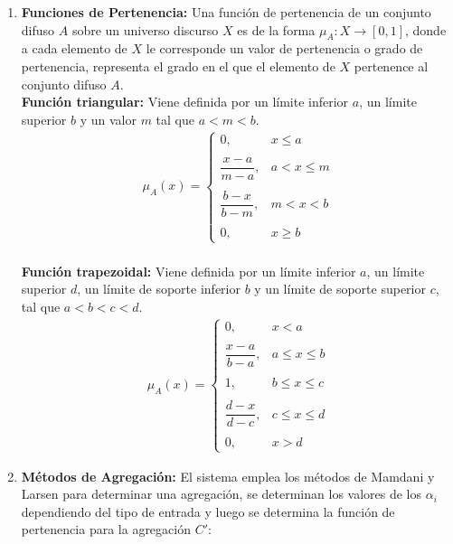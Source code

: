 \documentclass[10pt,letterpaper]{article}
\begin{document}
\begin{enumerate} 
\item \textbf{Funciones de Pertenencia:}
Una función de pertenencia de un conjunto difuso $A$ sobre un universo discurso $X$ es de la forma $\mu_{A}:X \rightarrow [0,1]$, donde a cada elemento de $X$ le corresponde un valor de pertenencia o grado de pertenencia, representa el grado en el que el elemento de $X$ pertenence al conjunto difuso $A$.\\
	
	\textbf{Función triangular:} Viene definida por un límite inferior $a$, un límite superior $b$ y un valor $m$ tal que $a < m < b$.
	\begin{align*}
		\mu_A (x) = \begin{cases}
		0, & x \leq a \\\\
		\dfrac{x - a}{m - a}, & a < x \leq m \\\\
		\dfrac{b - x}{b - m}, & m < x < b \\\\
		0, & x \ge b
		\end{cases}
	\end{align*}\\
	
	\textbf{Función trapezoidal:} Viene definida por un límite inferior $a$, un límite superior $d$, un límite de soporte inferior $b$ y un límite de soporte superior $c$, tal que $a < b < c < d$.
	\begin{align*}
		\mu_A (x) = \begin{cases}
		0, & x < a \\\\
		\dfrac{x - a}{b - a}, & a \leq x \leq b \\\\
		1, & b \leq x \leq c \\\\
		\dfrac{d - x}{d - c}, & c \leq x \leq d \\\\
		0, & x > d
		\end{cases}
	\end{align*}
	
\item \textbf{Métodos de Agregación:}
El sistema emplea los m\'etodos de Mamdani y Larsen para determinar una agregaci\'on, se determinan los valores de los $\alpha_i$ dependiendo del tipo de entrada y luego se determina la funci\'on de pertenencia para la agregaci\'on $C'$:


\end{enumerate}
\end{document}
